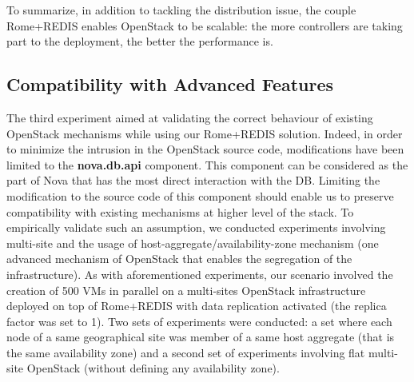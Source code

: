 To summarize, in addition to tackling the distribution issue, the couple
Rome+REDIS enables OpenStack to be scalable: the more controllers are taking
part to the deployment, the better the performance is.
\subsection{Compatibility with Advanced Features\label{sec:host_aggregates_exps}}

The third experiment aimed at validating the correct behaviour of existing
OpenStack mechanisms while using our Rome+REDIS solution. Indeed, in order to
minimize the intrusion in the OpenStack source code, modifications have been
limited to the \textbf{nova.db.api} component. This component can be considered
as the part of Nova that has the most direct interaction with the DB. Limiting
the modification to the source code of this component should enable us to
preserve compatibility with existing mechanisms at higher level of the stack. To
empirically validate such an assumption, we conducted experiments involving
multi-site and the usage of host-aggregate/availability-zone mechanism (one
advanced mechanism of OpenStack that enables the segregation of the
infrastructure). As with aforementioned experiments, our scenario
involved the creation of 500 VMs in parallel on a multi-sites OpenStack
infrastructure deployed on top of Rome+REDIS with data replication activated
(the replica factor was set to 1). Two sets of experiments were conducted: a set
where each node of a same geographical site was member of a same host aggregate (that is the same availability zone) and a second set of experiments involving flat multi-site
OpenStack (\ie without defining any availability zone). 



